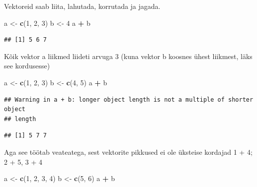 \documentclass[]{book}
\newenvironment{Shaded}{\begin{snugshade}}{\end{snugshade}}
\newcommand{\KeywordTok}[1]{\textcolor[rgb]{0.13,0.29,0.53}{\textbf{#1}}}
\newcommand{\DecValTok}[1]{\textcolor[rgb]{0.00,0.00,0.81}{#1}}
\newcommand{\StringTok}[1]{\textcolor[rgb]{0.31,0.60,0.02}{#1}}
\newcommand{\OperatorTok}[1]{\textcolor[rgb]{0.81,0.36,0.00}{\textbf{#1}}}
\newcommand{\NormalTok}[1]{#1}
\begin{document}
Vektoreid saab liita, lahutada, korrutada ja jagada.

\begin{Shaded}
\begin{Highlighting}[]
\NormalTok{a <-}\StringTok{ }\KeywordTok{c}\NormalTok{(}\DecValTok{1}\NormalTok{, }\DecValTok{2}\NormalTok{, }\DecValTok{3}\NormalTok{)}
\NormalTok{b <-}\StringTok{ }\DecValTok{4}
\NormalTok{a }\OperatorTok{+}\StringTok{ }\NormalTok{b}
\end{Highlighting}
\end{Shaded}

\begin{verbatim}
## [1] 5 6 7
\end{verbatim}

Kõik vektor a liikmed liideti arvuga 3 (kuna vektor b koosnes ühest
liikmest, läks see kordusesse)

\begin{Shaded}
\begin{Highlighting}[]
\NormalTok{a <-}\StringTok{ }\KeywordTok{c}\NormalTok{(}\DecValTok{1}\NormalTok{, }\DecValTok{2}\NormalTok{, }\DecValTok{3}\NormalTok{)}
\NormalTok{b <-}\StringTok{ }\KeywordTok{c}\NormalTok{(}\DecValTok{4}\NormalTok{, }\DecValTok{5}\NormalTok{) }
\NormalTok{a }\OperatorTok{+}\StringTok{ }\NormalTok{b}
\end{Highlighting}
\end{Shaded}

\begin{verbatim}
## Warning in a + b: longer object length is not a multiple of shorter object
## length
\end{verbatim}

\begin{verbatim}
## [1] 5 7 7
\end{verbatim}

Aga see töötab veateatega, sest vektorite pikkused ei ole üksteise
kordajad 1 + 4; 2 + 5, 3 + 4

\begin{Shaded}
\begin{Highlighting}[]
\NormalTok{a <-}\StringTok{ }\KeywordTok{c}\NormalTok{(}\DecValTok{1}\NormalTok{, }\DecValTok{2}\NormalTok{, }\DecValTok{3}\NormalTok{, }\DecValTok{4}\NormalTok{)}
\NormalTok{b <-}\StringTok{ }\KeywordTok{c}\NormalTok{(}\DecValTok{5}\NormalTok{, }\DecValTok{6}\NormalTok{) }
\NormalTok{a }\OperatorTok{+}\StringTok{ }\NormalTok{b}
\end{Highlighting}
\end{Shaded}
\end{document}
